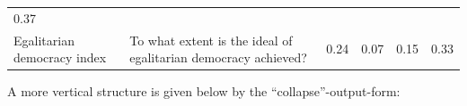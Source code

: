 \documentclass[]{report}
\newenvironment{Shaded}{\begin{snugshade}}{\end{snugshade}}
\newcommand{\KeywordTok}[1]{\textcolor[rgb]{0.13,0.29,0.53}{\textbf{#1}}}
\newcommand{\DataTypeTok}[1]{\textcolor[rgb]{0.13,0.29,0.53}{#1}}
\newcommand{\CharTok}[1]{\textcolor[rgb]{0.31,0.60,0.02}{#1}}
\newcommand{\StringTok}[1]{\textcolor[rgb]{0.31,0.60,0.02}{#1}}
\newcommand{\OtherTok}[1]{\textcolor[rgb]{0.56,0.35,0.01}{#1}}
\newcommand{\ControlFlowTok}[1]{\textcolor[rgb]{0.13,0.29,0.53}{\textbf{#1}}}
\newcommand{\OperatorTok}[1]{\textcolor[rgb]{0.81,0.36,0.00}{\textbf{#1}}}
\newcommand{\NormalTok}[1]{#1}
\theoremstyle{definition}
\theoremstyle{definition}
\theoremstyle{definition}
\theoremstyle{remark}
\begin{document}
\begin{longtable}[]{@{}llrrrr@{}}
\begin{minipage}[t]{0.08\columnwidth}
0.37\strut
\end{minipage}\tabularnewline
\begin{minipage}[t]{0.16\columnwidth}\raggedright\strut
Egalitarian democracy index\strut
\end{minipage} & \begin{minipage}[t]{0.42\columnwidth}\raggedright\strut
To what extent is the ideal of egalitarian democracy achieved?\strut
\end{minipage} & \begin{minipage}[t]{0.03\columnwidth}\raggedleft\strut
0.24\strut
\end{minipage} & \begin{minipage}[t]{0.08\columnwidth}\raggedleft\strut
0.07\strut
\end{minipage} & \begin{minipage}[t]{0.08\columnwidth}\raggedleft\strut
0.15\strut
\end{minipage} & \begin{minipage}[t]{0.08\columnwidth}\raggedleft\strut
0.33\strut
\end{minipage}\tabularnewline
\bottomrule
\end{longtable}

A more vertical structure is given below by the
``collapse''-output-form:

\begin{Shaded}
\end{Shaded}
\end{document}
